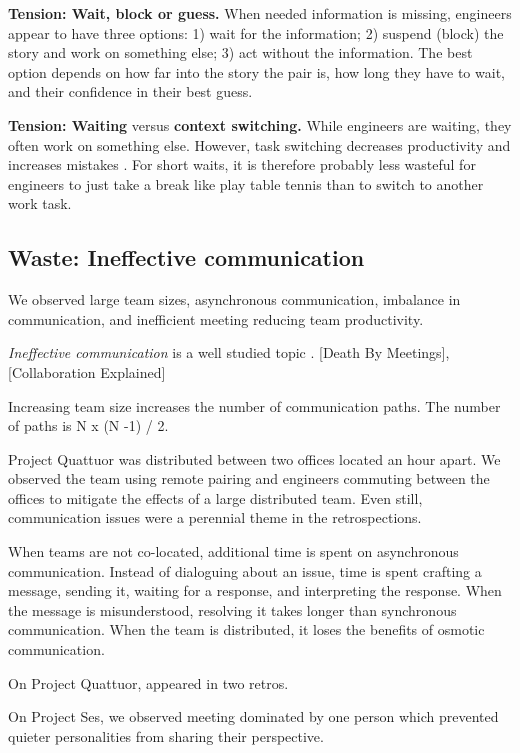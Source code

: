 \textbf{Tension: Wait, block or guess.}
When needed information is missing, engineers appear to have three options: 1) wait for the information; 2) suspend (block) the story and work on something else; 3) act without the information. The best option depends on how far into the story the pair is, how long they have to wait, and their confidence in their best guess.

\textbf{Tension: Waiting} versus \textbf{context switching.}
While engineers are waiting, they often work on something else. However, task switching decreases productivity and increases mistakes \cite{MonsellTaskSwitching}. For short waits, it is therefore probably less wasteful for engineers to just take a break like play table tennis than to switch to another work task. 

\subsection{Waste: Ineffective communication}
We observed large team sizes, asynchronous communication, imbalance in communication, and inefficient meeting reducing team productivity.

\textit{Ineffective communication} is a well studied topic . [Death By Meetings],  [Collaboration Explained]


Increasing team size increases the number of communication paths. The number of paths is N x (N -1) / 2. 

Project Quattuor was distributed between two offices located an hour apart. We observed the team using remote pairing and engineers commuting between the offices to mitigate the effects of a large distributed team. Even still, communication issues were a perennial theme in the retrospections.

When teams are not co-located, additional time is spent on asynchronous communication. Instead of dialoguing about an issue, time is spent crafting a message, sending it, waiting for a response, and interpreting the response. When the message is misunderstood, resolving it takes longer than synchronous communication. When the team is distributed, it loses the benefits of osmotic communication.

On Project Quattuor,  appeared in two retros. 

On Project Ses, we observed meeting dominated by one person which prevented quieter personalities from sharing their perspective. 

